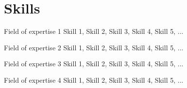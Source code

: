 \section{Skills}
\begin{skillset}{Field of expertise 1}
    Skill 1, Skill 2, Skill 3, Skill 4, Skill 5, ...
\end{skillset}
\begin{skillset}{Field of expertise 2}
    Skill 1, Skill 2, Skill 3, Skill 4, Skill 5, ...
\end{skillset}
\begin{skillset}{Field of expertise 3}
    Skill 1, Skill 2, Skill 3, Skill 4, Skill 5, ...
\end{skillset}
\begin{skillset}{Field of expertise 4}
    Skill 1, Skill 2, Skill 3, Skill 4, Skill 5, ...
\end{skillset}